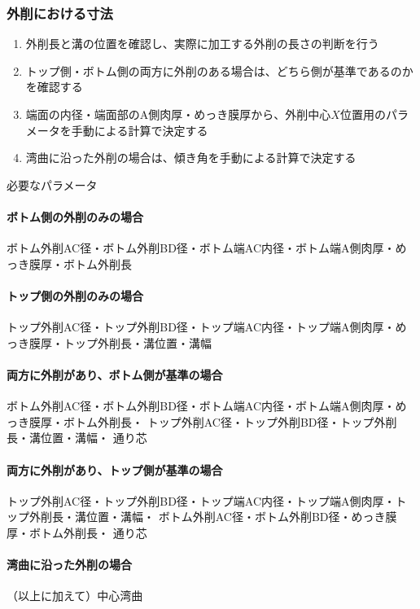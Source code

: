 \subsubsection{外削における寸法}
\begin{enumerate}
\item {}外削長と溝の位置を確認し、実際に加工する外削の長さの判断を行う
\item トップ側・ボトム側の両方に外削のある場合は、どちら側が基準であるのかを確認する
\item {}端面の内径・端面部のA側肉厚・めっき膜厚から、外削中心$X$位置用のパラメータを手動による計算で決定する
\item {}湾曲に沿った外削の場合は、傾き角を手動による計算で決定する
\end{enumerate}
\begin{Parameter}{必要なパラメータ}
\paragraph*{ボトム側の外削のみの場合}
ボトム外削AC径・ボトム外削BD径・ボトム端AC内径・ボトム端A側肉厚・めっき膜厚・ボトム外削長
\tcbline*
\paragraph*{トップ側の外削のみの場合}
トップ外削AC径・トップ外削BD径・トップ端AC内径・トップ端A側肉厚・めっき膜厚・トップ外削長・溝位置・溝幅
\tcbline*
\paragraph*{両方に外削があり、ボトム側が基準の場合}
ボトム外削AC径・ボトム外削BD径・ボトム端AC内径・ボトム端A側肉厚・めっき膜厚・ボトム外削長・
トップ外削AC径・トップ外削BD径・トップ外削長・溝位置・溝幅・
通り芯
\tcbline*
\paragraph*{両方に外削があり、トップ側が基準の場合}
トップ外削AC径・トップ外削BD径・トップ端AC内径・トップ端A側肉厚・トップ外削長・溝位置・溝幅・
ボトム外削AC径・ボトム外削BD径・めっき膜厚・ボトム外削長・
通り芯
\tcbline*
\paragraph*{湾曲に沿った外削の場合}
（以上に加えて）中心湾曲
\end{Parameter}

